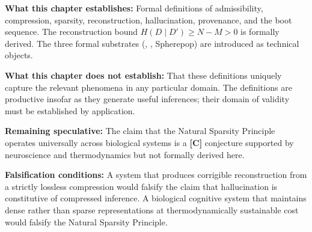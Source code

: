 \begin{constraintboundary}
\textbf{What this chapter establishes:} Formal definitions of admissibility,
compression, sparsity, reconstruction, hallucination, provenance, and the boot
sequence. The reconstruction bound $H(D \mid D') \geq N - M > 0$ is formally
derived. The three formal substrates (\RSVP, \KES, Spherepop) are introduced as
technical objects.

\textbf{What this chapter does not establish:} That these definitions uniquely
capture the relevant phenomena in any particular domain. The definitions are
productive insofar as they generate useful inferences; their domain of validity
must be established by application.

\textbf{Remaining speculative:} The claim that the Natural Sparsity Principle
operates universally across biological systems is a \textbf{[C]} conjecture
supported by neuroscience and thermodynamics but not formally derived here.

\textbf{Falsification conditions:} A system that produces corrigible reconstruction
from a strictly lossless compression would falsify the claim that hallucination is
constitutive of compressed inference. A biological cognitive system that maintains
dense rather than sparse representations at thermodynamically sustainable cost
would falsify the Natural Sparsity Principle.
\end{constraintboundary}
